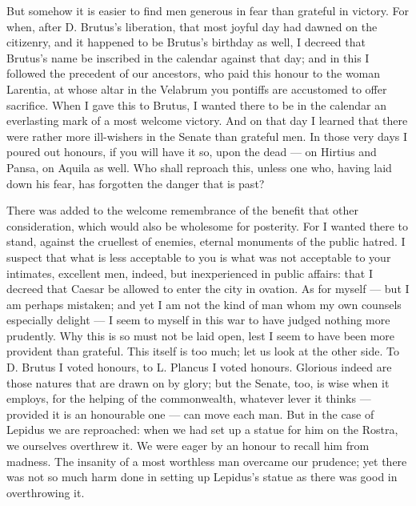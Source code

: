  But somehow it is easier to find men generous in fear than grateful in victory. For when, after D. Brutus's liberation, that most joyful day had dawned on the citizenry, and it happened to be Brutus's birthday as well, I decreed that Brutus's name be inscribed in the calendar against that day; and in this I followed the precedent of our ancestors, who paid this honour to the woman Larentia, at whose altar in the Velabrum you pontiffs are accustomed to offer sacrifice. When I gave this to Brutus, I wanted there to be in the calendar an everlasting mark of a most welcome victory. And on that day I learned that there were rather more ill-wishers in the Senate than grateful men. In those very days I poured out honours, if you will have it so, upon the dead --- on Hirtius and Pansa, on Aquila as well. Who shall reproach this, unless one who, having laid down his fear, has forgotten the danger that is past?

 There was added to the welcome remembrance of the benefit that other consideration, which would also be wholesome for posterity. For I wanted there to stand, against the cruellest of enemies, eternal monuments of the public hatred. I suspect that what is less acceptable to you is what was not acceptable to your intimates, excellent men, indeed, but inexperienced in public affairs: that I decreed that Caesar be allowed to enter the city in ovation. As for myself --- but I am perhaps mistaken; and yet I am not the kind of man whom my own counsels especially delight --- I seem to myself in this war to have judged nothing more prudently. Why this is so must not be laid open, lest I seem to have been more provident than grateful. This itself is too much; let us look at the other side. To D. Brutus I voted honours, to L. Plancus I voted honours. Glorious indeed are those natures that are drawn on by glory; but the Senate, too, is wise when it employs, for the helping of the commonwealth, whatever lever it thinks --- provided it is an honourable one --- can move each man. But in the case of Lepidus we are reproached: when we had set up a statue for him on the Rostra, we ourselves overthrew it. We were eager by an honour to recall him from madness. The insanity of a most worthless man overcame our prudence; yet there was not so much harm done in setting up Lepidus's statue as there was good in overthrowing it.

